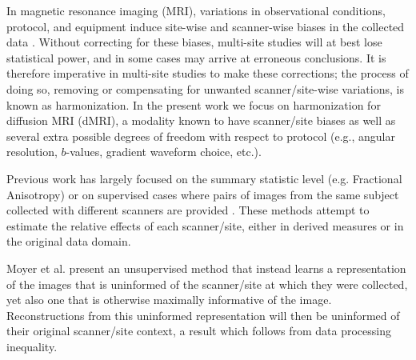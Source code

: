 \documentclass{midl} %
\begin{document}
In magnetic resonance imaging (MRI), variations in observational conditions, protocol, and equipment induce site-wise and scanner-wise biases in the collected data \cite{chen2014exploration,fortin2017harmonization,jovicich2006reliability}.
Without correcting for these biases, multi-site studies will at best lose statistical power, and in some cases may arrive at erroneous conclusions. It is therefore imperative in multi-site studies to make these corrections; the process of doing so, removing or compensating for unwanted scanner/site-wise variations, is known as harmonization. In the present work we focus on harmonization for diffusion MRI (dMRI), a modality known to have scanner/site biases \cite{correia2009looking,giannelli2010dependence,pagani2010intercenter,papinutto2013reproducibility,vollmar2010identical,white2009global,zhan2010does,zhan2013magnetic,zhan2012spatial} as well as several extra possible degrees of freedom with respect to protocol (e.g., angular resolution, $b$-values, gradient waveform choice, etc.).

Previous work has largely focused on the summary statistic level (e.g. Fractional Anisotropy) \cite{fortin2017harmonization,zavaliangos2018diffusion} or on supervised cases where pairs of images from the same subject collected with different scanners are provided \cite{blumberg2018deeper,tanno2017bayesian}. These methods attempt to estimate the relative effects of each scanner/site, either in derived measures or in the original data domain.

Moyer et al. \cite{moyer2019scanner} present an unsupervised method that instead learns a representation of the images that is uninformed of the scanner/site at which they were collected, yet also one that is otherwise maximally informative of the image. Reconstructions from this uninformed representation will then be uninformed of their original scanner/site context, a result which follows from data processing inequality.
\end{document}
